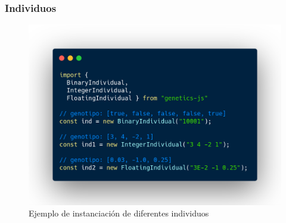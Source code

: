 \documentclass{beamer}
\begin{document}
\begin{frame}
\frametitle{Individuos}

\begin{figure}
  \centering
  \includegraphics[scale=0.23]{pres/img/desarrollo/individual-example.png}
  \caption{Ejemplo de instanciación de diferentes individuos}
  \label{fig:my_label}
\end{figure}

\end{frame}
\end{document}
